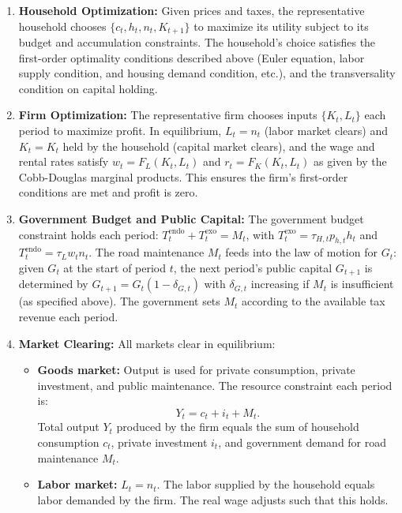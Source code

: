 \begin{enumerate}
    \item \textbf{Household Optimization:} Given prices and taxes, the representative household chooses $\{c_t, h_t, n_t, K_{t+1}\}$ to maximize its utility subject to its budget and accumulation constraints. The household’s choice satisfies the first-order optimality conditions described above (Euler equation, labor supply condition, and housing demand condition, etc.), and the transversality condition on capital holding.

    \item \textbf{Firm Optimization:} The representative firm chooses inputs $\{K_t, L_t\}$ each period to maximize profit. In equilibrium, $L_t = n_t$ (labor market clears) and $K_t = K_t$ held by the household (capital market clears), and the wage and rental rates satisfy $w_t = F_L(K_t,L_t)$ and $r_t = F_K(K_t,L_t)$ as given by the Cobb-Douglas marginal products. This ensures the firm’s first-order conditions are met and profit is zero.

    \item \textbf{Government Budget and Public Capital:} The government budget constraint holds each period: $T^{\text{endo}}_t + T^{\text{exo}}_t = M_t$, with $T^{\text{exo}}_t = \tau_{H,t} p_{h,t} h_t$ and $T^{\text{endo}}_t = \tau_L w_t n_t$. The road maintenance $M_t$ feeds into the law of motion for $G_t$: given $G_t$ at the start of period $t$, the next period’s public capital $G_{t+1}$ is determined by $G_{t+1} = G_t(1 - \delta_{G,t})$ with $\delta_{G,t}$ increasing if $M_t$ is insufficient (as specified above). The government sets $M_t$ according to the available tax revenue each period.

    \item \textbf{Market Clearing:} All markets clear in equilibrium:
    \begin{itemize}
        \item \textbf{Goods market:} Output is used for private consumption, private investment, and public maintenance. The resource constraint each period is:
        \begin{equation}
        Y_t = c_t + i_t + M_t.
        \end{equation}
        Total output $Y_t$ produced by the firm equals the sum of household consumption $c_t$, private investment $i_t$, and government demand for road maintenance $M_t$.

        \item \textbf{Labor market:} $L_t = n_t$. The labor supplied by the household equals labor demanded by the firm. The real wage adjusts such that this holds.


\end{itemize}
\end{enumerate}
